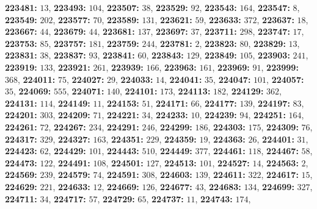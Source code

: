\textsf{\bfseries 223481:} $13$, \textsf{\bfseries 223493:} $104$, \textsf{\bfseries 223507:} $38$, \textsf{\bfseries 223529:} $92$, \textsf{\bfseries 223543:} $164$, \textsf{\bfseries 223547:} $8$, \textsf{\bfseries 223549:} $202$, \textsf{\bfseries 223577:} $70$, \textsf{\bfseries 223589:} $131$, \textsf{\bfseries 223621:} $59$, \textsf{\bfseries 223633:} $372$, \textsf{\bfseries 223637:} $18$, \textsf{\bfseries 223667:} $44$, \textsf{\bfseries 223679:} $44$, \textsf{\bfseries 223681:} $137$, \textsf{\bfseries 223697:} $37$, \textsf{\bfseries 223711:} $298$, \textsf{\bfseries 223747:} $17$, \textsf{\bfseries 223753:} $85$, \textsf{\bfseries 223757:} $181$, \textsf{\bfseries 223759:} $244$, \textsf{\bfseries 223781:} $2$, \textsf{\bfseries 223823:} $80$, \textsf{\bfseries 223829:} $13$, \textsf{\bfseries 223831:} $38$, \textsf{\bfseries 223837:} $93$, \textsf{\bfseries 223841:} $60$, \textsf{\bfseries 223843:} $129$, \textsf{\bfseries 223849:} $105$, \textsf{\bfseries 223903:} $241$, \textsf{\bfseries 223919:} $133$, \textsf{\bfseries 223921:} $261$, \textsf{\bfseries 223939:} $166$, \textsf{\bfseries 223963:} $161$, \textsf{\bfseries 223969:} $91$, \textsf{\bfseries 223999:} $368$, \textsf{\bfseries 224011:} $75$, \textsf{\bfseries 224027:} $29$, \textsf{\bfseries 224033:} $14$, \textsf{\bfseries 224041:} $35$, \textsf{\bfseries 224047:} $101$, \textsf{\bfseries 224057:} $35$, \textsf{\bfseries 224069:} $555$, \textsf{\bfseries 224071:} $140$, \textsf{\bfseries 224101:} $173$, \textsf{\bfseries 224113:} $182$, \textsf{\bfseries 224129:} $362$, \textsf{\bfseries 224131:} $114$, \textsf{\bfseries 224149:} $11$, \textsf{\bfseries 224153:} $51$, \textsf{\bfseries 224171:} $66$, \textsf{\bfseries 224177:} $139$, \textsf{\bfseries 224197:} $83$, \textsf{\bfseries 224201:} $303$, \textsf{\bfseries 224209:} $71$, \textsf{\bfseries 224221:} $34$, \textsf{\bfseries 224233:} $10$, \textsf{\bfseries 224239:} $94$, \textsf{\bfseries 224251:} $164$, \textsf{\bfseries 224261:} $72$, \textsf{\bfseries 224267:} $234$, \textsf{\bfseries 224291:} $246$, \textsf{\bfseries 224299:} $186$, \textsf{\bfseries 224303:} $175$, \textsf{\bfseries 224309:} $76$, \textsf{\bfseries 224317:} $329$, \textsf{\bfseries 224327:} $163$, \textsf{\bfseries 224351:} $229$, \textsf{\bfseries 224359:} $19$, \textsf{\bfseries 224363:} $26$, \textsf{\bfseries 224401:} $31$, \textsf{\bfseries 224423:} $62$, \textsf{\bfseries 224429:} $101$, \textsf{\bfseries 224443:} $510$, \textsf{\bfseries 224449:} $377$, \textsf{\bfseries 224461:} $118$, \textsf{\bfseries 224467:} $58$, \textsf{\bfseries 224473:} $122$, \textsf{\bfseries 224491:} $108$, \textsf{\bfseries 224501:} $127$, \textsf{\bfseries 224513:} $101$, \textsf{\bfseries 224527:} $14$, \textsf{\bfseries 224563:} $2$, \textsf{\bfseries 224569:} $239$, \textsf{\bfseries 224579:} $74$, \textsf{\bfseries 224591:} $308$, \textsf{\bfseries 224603:} $139$, \textsf{\bfseries 224611:} $322$, \textsf{\bfseries 224617:} $15$, \textsf{\bfseries 224629:} $221$, \textsf{\bfseries 224633:} $12$, \textsf{\bfseries 224669:} $126$, \textsf{\bfseries 224677:} $43$, \textsf{\bfseries 224683:} $134$, \textsf{\bfseries 224699:} $327$, \textsf{\bfseries 224711:} $34$, \textsf{\bfseries 224717:} $57$, \textsf{\bfseries 224729:} $65$, \textsf{\bfseries 224737:} $11$, \textsf{\bfseries 224743:} $174$, 
